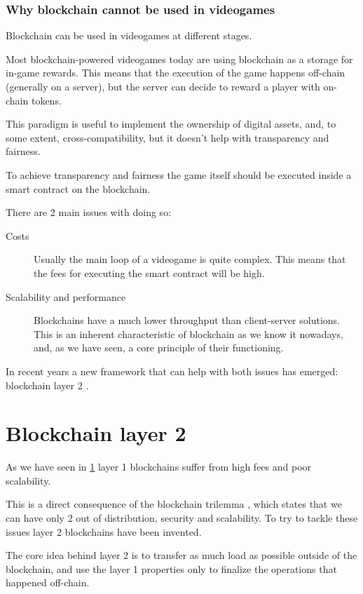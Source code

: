 \documentclass[12pt]{article}
\begin{document}
\section{Why blockchain cannot be used in videogames} \label{section:wbcnbuiv}
Blockchain can be used in videogames at different stages.

Most blockchain-powered videogames today are using blockchain as a storage for in-game rewards. This means that the execution of the game happens off-chain (generally on a server), but the server can decide to reward a player with on-chain tokens.

This paradigm is useful to implement the ownership of digital assets, and, to some extent, cross-compatibility, but it doesn't help with transparency and fairness.

To achieve transparency and fairness the game itself should be executed inside a smart contract on the blockchain.

There are 2 main issues with doing so:
\begin{description}
    \item[Costs] Usually the main loop of a videogame is quite complex. This means that the fees for executing the smart contract will be high.
    \item[Scalability and performance] Blockchains have a much lower throughput than client-server solutions. This is an inherent characteristic of blockchain as we know it nowadays, and, as we have seen, a core principle of their functioning.
\end{description}

In recent years a new framework that can help with both issues has emerged: blockchain layer 2 \cite{ethereum_scaling}.

\newpage

\part{Blockchain layer 2} \label{part:bl2}
As we have seen in \ref{section:wbcnbuiv} layer 1 blockchains suffer from high fees and poor scalability.

This is a direct consequence of the blockchain trilemma \cite{blockchain_trilemma}, which states that we can have only 2 out of distribution, security and scalability.
To try to tackle these issues layer 2 blockchains have been invented.

The core idea behind layer 2 is to transfer as much load as possible outside of the blockchain, and use the layer 1 properties only to finalize the operations that happened off-chain.
\end{document}

